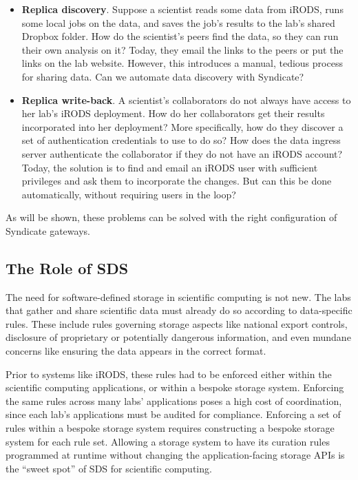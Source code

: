 \begin{itemize}
\item \textbf{Replica discovery}.  Suppose a scientist reads some data from iRODS,
runs some local jobs on the data, and saves the job's results to the lab's shared Dropbox
folder.  How do the scientist's peers find the data, so they can run their own
analysis on it?  Today, they email the links to the peers or put the links on the lab
website.  However, this introduces a manual, tedious process for sharing data.  Can we
automate data discovery with Syndicate?
\item \textbf{Replica write-back}.  A scientist's collaborators do not always
have access to her lab's iRODS deployment.  How do her collaborators get their results incorporated
into her deployment?  More specifically, how do they discover a set of
authentication credentials to use to do so?  How does the data ingress server authenticate the
collaborator if they do not have an iRODS account?  Today, the solution is to find
and email an iRODS user with sufficient privileges and ask them to incorporate
the changes.  But can this be done automatically, without requiring users
in the loop?
\end{itemize}

As will be shown, these problems can be solved with the right configuration of Syndicate gateways.

\subsection{The Role of SDS}

The need for software-defined storage in scientific computing is not new.  The
labs that gather and share scientific data must already do so according to
data-specific rules.  These include rules governing storage aspects like
national export controls, disclosure of proprietary or potentially dangerous information, and
even mundane concerns like ensuring the data appears in the correct format.

Prior to systems like iRODS, these rules had to be enforced either within the
scientific computing applications, or within a bespoke storage system.
Enforcing the same rules across many labs' applications poses a high cost of
coordination, since each lab's applications must be audited for compliance.
Enforcing a set of rules within a bespoke storage system requires constructing a
bespoke storage system for each rule set.  Allowing a storage system to have its
curation rules programmed at runtime without changing the application-facing
storage APIs is the ``sweet spot'' of SDS for scientific computing.

